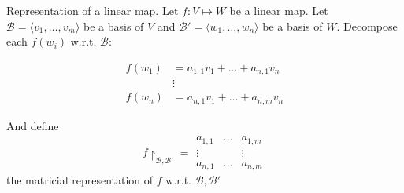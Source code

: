 \documentclass{beamer}
\begin{document}
\begin{frame}{Representation of a linear map.}
  Let $f: V \mapsto W$ be a linear map. Let $\mathcal{B} = \langle v_1, \dots, v_m \rangle$ be a basis of $V$ and $\mathcal{B'} = \langle w_1, \dots, w_n \rangle$ be a basis of $W$. Decompose each $f(w_i)$ w.r.t. $\mathcal{B}$:

  \[\begin{aligned}
  f(w_1) &= a_{1,1} v_1 + \dots + a_{n,1} v_n\\
  &\vdots\\
  f(w_n) & = a_{n,1} v_1 + \dots + a_{n,m} v_n
  \end{aligned}\]

  And define \[f\restriction_{\mathcal{B}, \mathcal{B'}} =  \begin{array}{|ccc|}
    a_{1,1} & \dots & a_{1,m}\\ \vdots & & \vdots\\ a_{n,1} & \dots & a_{n, m}
  \end{array}\] the matricial representation of $f$ w.r.t. $\mathcal{B}, \mathcal{B'}$
  
\end{frame}
\end{document}
